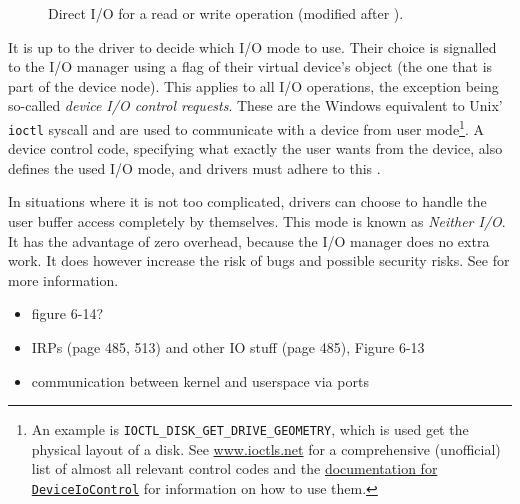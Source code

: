\begin{figure}[htb!]
	\caption[
		Direct I/O for a read or write operation
	]{
		Direct I/O for a read or write operation (modified after \cite{Yosifovich2017}).
	}
	\label{fig:background.kerneldriver.directio}
\end{figure}

It is up to the driver to decide which I/O mode to use. Their choice is signalled to the I/O manager using a flag of their virtual device's object (the one that is part of the device node). This applies to all I/O operations, the exception being so-called \emph{device I/O control requests}. These are the Windows equivalent to Unix' \texttt{ioctl} syscall and are used to communicate with a device from user mode\footnote{\label{fn:background.kerneldriver.ioctls} An example is \texttt{IOCTL\_DISK\_GET\_DRIVE\_GEOMETRY}, which is used get the physical layout of a disk. See \url{www.ioctls.net} for a comprehensive (unofficial) list of almost all relevant control codes and the \href{https://docs.microsoft.com/en-us/windows/win32/api/ioapiset/nf-ioapiset-deviceiocontrol}{documentation for \texttt{DeviceIoControl}} for information on how to use them.}. A device control code, specifying what exactly the user wants from the device, also defines the used I/O mode, and drivers must adhere to this \cite{Yosifovich2017}.

In situations where it is not too complicated, drivers can choose to handle the user buffer access completely by themselves. This mode is known as \emph{Neither I/O}. It has the advantage of zero overhead, because the I/O manager does no extra work. It does however increase the risk of bugs and possible security risks. See \cite{Yosifovich2017} for more information.

\begin{itemize}
	\item figure 6-14?
	\item IRPs (page 485, 513) and other IO stuff (page 485), Figure 6-13
	\item communication between kernel and userspace via ports
\end{itemize}

